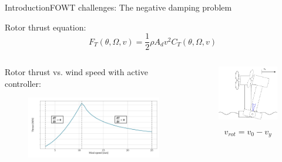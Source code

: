 \begin{frame}{Introduction}{FOWT challenges: The negative damping problem}
	
	Rotor thrust equation:
	\begin{equation} \label{eq:aero_thrust}
		F_T(\theta, \Omega, v) = \dfrac{1}{2} \rho A_d v^2 C_T(\theta, \Omega, v)
	\end{equation}
	
	\begin{columns}
		\begin{column}{.6\linewidth}
			Rotor thrust vs. wind speed with active controller:
			\begin{figure}[ht]
				\centering
				\includegraphics[width=1\linewidth]{../Graphics/ThrustWindpeedCurve.PNG}
				\label{fig:thrust_vs_windspeed}
			\end{figure}
			
		\end{column}
		\begin{column}{.4\linewidth}
			\begin{figure}[ht]
				\centering
				\includegraphics[width=1\linewidth]{../Graphics/ForeAftMotionModel_onlyTurbine.pdf}
				\label{fig:turbine_foreaft}
			\end{figure}
			\begin{equation*}\label{eq:vrot}
				v_{rot} = v_0 - v_y
			\end{equation*}
		\end{column}
	\end{columns}
	

\end{frame}
